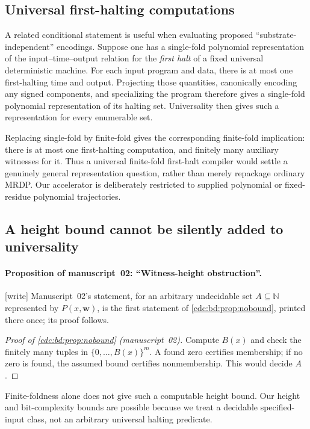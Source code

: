 \documentclass[11pt,a4paper]{article}
\theoremstyle{definition}
\theoremstyle{remark}
\newcommand{\N}{\mathbb N}
\newcommand{\wtag}{\textup{[write]}}%
\begin{document}
\subsection{Universal first-halting computations}\label{cdc:pt:sec:firsthalt}
A related conditional statement is useful when evaluating proposed
``substrate-independent'' encodings. Suppose one has a single-fold
polynomial representation of the input--time--output relation for the
\emph{first halt} of a fixed universal deterministic machine. For each
input program and data, there is at most one first-halting time and
output. Projecting those quantities, canonically encoding any signed
components, and specializing the program therefore gives a single-fold
polynomial representation of its halting set. Universality then gives
such a representation for every enumerable set.

Replacing single-fold by finite-fold gives the corresponding finite-fold
implication: there is at most one first-halting computation, and finitely
many auxiliary witnesses for it. Thus a universal finite-fold first-halt
compiler would settle a genuinely general representation question, rather
than merely repackage ordinary MRDP. Our accelerator is deliberately
restricted to supplied polynomial or fixed-residue polynomial trajectories.

\subsection{A height bound cannot be silently added to universality}

\paragraph{Proposition of manuscript~02: ``Witness-height obstruction''.} \wtag{} Manuscript~02's statement, for an arbitrary undecidable set $A\subseteq\N$ represented by $P(x,\boldsymbol w)$, is the first statement of \cref{cdc:bd:prop:nobound}, printed there once; its proof follows.

\begin{proof}[Proof of \cref{cdc:bd:prop:nobound} (manuscript~02)]
Compute $B(x)$ and check the finitely many tuples in
$\{0,\ldots,B(x)\}^m$. A found zero certifies membership; if no zero is
found, the assumed bound certifies nonmembership. This would decide $A$.
\end{proof}
Finite-foldness alone does not give such a computable height bound. Our
height and bit-complexity bounds are possible because we treat a decidable
specified-input class, not an arbitrary universal halting predicate.
\end{document}
